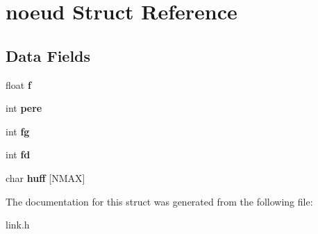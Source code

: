 \hypertarget{structnoeud}{}\section{noeud Struct Reference}
\label{structnoeud}
\subsection*{Data Fields}
\begin{DoxyCompactItemize}
\item 
\hypertarget{structnoeud_af900396d7b72ff2a7002e8befe8cf8f1}{}float {\bfseries f}\label{structnoeud_af900396d7b72ff2a7002e8befe8cf8f1}

\item 
\hypertarget{structnoeud_a6d12968b1ad7200da8663f9c743fb093}{}int {\bfseries pere}\label{structnoeud_a6d12968b1ad7200da8663f9c743fb093}

\item 
\hypertarget{structnoeud_ac1c7797c0ac73d1cccf74f75b265e810}{}int {\bfseries fg}\label{structnoeud_ac1c7797c0ac73d1cccf74f75b265e810}

\item 
\hypertarget{structnoeud_a6f8059414f0228f0256115e024eeed4b}{}int {\bfseries fd}\label{structnoeud_a6f8059414f0228f0256115e024eeed4b}

\item 
\hypertarget{structnoeud_abb12e9bfc888a99b22fcc78d104a2ae1}{}char {\bfseries huff} \mbox{[}N\+M\+A\+X\mbox{]}\label{structnoeud_abb12e9bfc888a99b22fcc78d104a2ae1}

\end{DoxyCompactItemize}


The documentation for this struct was generated from the following file\+:\begin{DoxyCompactItemize}
\item 
link.\+h\end{DoxyCompactItemize}
